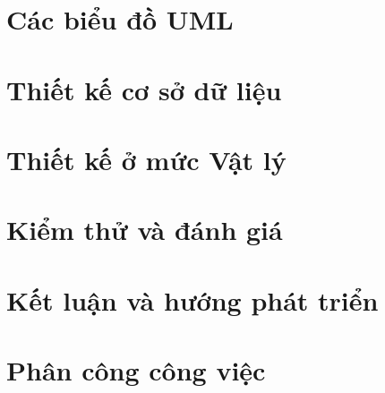 \documentclass[12pt,a4paper]{article}
\begin{document}
\section{Các biểu đồ UML}


\section{Thiết kế cơ sở dữ liệu}


\section{Thiết kế ở mức Vật lý}


\section{Kiểm thử và đánh giá}


\section{Kết luận và hướng phát triển}


\section{Phân công công việc}

\end{document}
